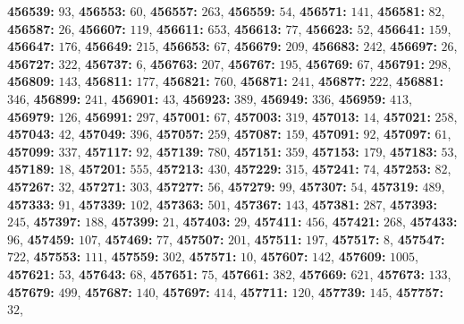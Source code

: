 \textsf{\bfseries 456539:} $93$, \textsf{\bfseries 456553:} $60$, \textsf{\bfseries 456557:} $263$, \textsf{\bfseries 456559:} $54$, \textsf{\bfseries 456571:} $141$, \textsf{\bfseries 456581:} $82$, \textsf{\bfseries 456587:} $26$, \textsf{\bfseries 456607:} $119$, \textsf{\bfseries 456611:} $653$, \textsf{\bfseries 456613:} $77$, \textsf{\bfseries 456623:} $52$, \textsf{\bfseries 456641:} $159$, \textsf{\bfseries 456647:} $176$, \textsf{\bfseries 456649:} $215$, \textsf{\bfseries 456653:} $67$, \textsf{\bfseries 456679:} $209$, \textsf{\bfseries 456683:} $242$, \textsf{\bfseries 456697:} $26$, \textsf{\bfseries 456727:} $322$, \textsf{\bfseries 456737:} $6$, \textsf{\bfseries 456763:} $207$, \textsf{\bfseries 456767:} $195$, \textsf{\bfseries 456769:} $67$, \textsf{\bfseries 456791:} $298$, \textsf{\bfseries 456809:} $143$, \textsf{\bfseries 456811:} $177$, \textsf{\bfseries 456821:} $760$, \textsf{\bfseries 456871:} $241$, \textsf{\bfseries 456877:} $222$, \textsf{\bfseries 456881:} $346$, \textsf{\bfseries 456899:} $241$, \textsf{\bfseries 456901:} $43$, \textsf{\bfseries 456923:} $389$, \textsf{\bfseries 456949:} $336$, \textsf{\bfseries 456959:} $413$, \textsf{\bfseries 456979:} $126$, \textsf{\bfseries 456991:} $297$, \textsf{\bfseries 457001:} $67$, \textsf{\bfseries 457003:} $319$, \textsf{\bfseries 457013:} $14$, \textsf{\bfseries 457021:} $258$, \textsf{\bfseries 457043:} $42$, \textsf{\bfseries 457049:} $396$, \textsf{\bfseries 457057:} $259$, \textsf{\bfseries 457087:} $159$, \textsf{\bfseries 457091:} $92$, \textsf{\bfseries 457097:} $61$, \textsf{\bfseries 457099:} $337$, \textsf{\bfseries 457117:} $92$, \textsf{\bfseries 457139:} $780$, \textsf{\bfseries 457151:} $359$, \textsf{\bfseries 457153:} $179$, \textsf{\bfseries 457183:} $53$, \textsf{\bfseries 457189:} $18$, \textsf{\bfseries 457201:} $555$, \textsf{\bfseries 457213:} $430$, \textsf{\bfseries 457229:} $315$, \textsf{\bfseries 457241:} $74$, \textsf{\bfseries 457253:} $82$, \textsf{\bfseries 457267:} $32$, \textsf{\bfseries 457271:} $303$, \textsf{\bfseries 457277:} $56$, \textsf{\bfseries 457279:} $99$, \textsf{\bfseries 457307:} $54$, \textsf{\bfseries 457319:} $489$, \textsf{\bfseries 457333:} $91$, \textsf{\bfseries 457339:} $102$, \textsf{\bfseries 457363:} $501$, \textsf{\bfseries 457367:} $143$, \textsf{\bfseries 457381:} $287$, \textsf{\bfseries 457393:} $245$, \textsf{\bfseries 457397:} $188$, \textsf{\bfseries 457399:} $21$, \textsf{\bfseries 457403:} $29$, \textsf{\bfseries 457411:} $456$, \textsf{\bfseries 457421:} $268$, \textsf{\bfseries 457433:} $96$, \textsf{\bfseries 457459:} $107$, \textsf{\bfseries 457469:} $77$, \textsf{\bfseries 457507:} $201$, \textsf{\bfseries 457511:} $197$, \textsf{\bfseries 457517:} $8$, \textsf{\bfseries 457547:} $722$, \textsf{\bfseries 457553:} $111$, \textsf{\bfseries 457559:} $302$, \textsf{\bfseries 457571:} $10$, \textsf{\bfseries 457607:} $142$, \textsf{\bfseries 457609:} $1005$, \textsf{\bfseries 457621:} $53$, \textsf{\bfseries 457643:} $68$, \textsf{\bfseries 457651:} $75$, \textsf{\bfseries 457661:} $382$, \textsf{\bfseries 457669:} $621$, \textsf{\bfseries 457673:} $133$, \textsf{\bfseries 457679:} $499$, \textsf{\bfseries 457687:} $140$, \textsf{\bfseries 457697:} $414$, \textsf{\bfseries 457711:} $120$, \textsf{\bfseries 457739:} $145$, \textsf{\bfseries 457757:} $32$, 
